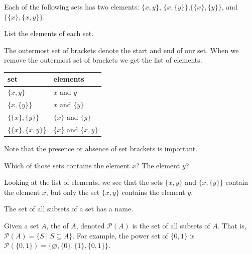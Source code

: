 \begin{exam}
\label{exam_2elt_sets}
    Each of the following sets has two elements: 
        $\{x, y\}$, $\{x,\{y\}\}$,$\{\{x\},\{y\}\}$, 
        and $\{\{x\}, \{x,y\} \}.$
        \begin{apart}
            \item List the elements of each set.
                \begin{soln}
                    The outermost set of brackets denote the start and end of our set.  When we remove the outermost set of brackets we get the list of elements.
                        \begin{center}
                            \begin{tabular}{l|l}
                                set & elements \\ \hline
                                $\{x, y\}$ &  $x$ and $y$\\
                                $\{x,\{y\}\}$ & $x$ and $\{y\}$ \\
                                $\{\{x\},\{y\}\}$ & $\{x\}$ and $\{y\}$ \\
                                $\{\{x\}, \{x,y\} \}$ & $\{x\}$ and $\{x,y\}$ 
                            \end{tabular}
                        \end{center}
                    Note that the presence or absence of set brackets is important. 
                \end{soln}
            \item Which of those sets contains the element $x$?  The element $y$?
                \begin{soln}
                    Looking at the list of elements, we see that the sets $\{x, y\}$ and $\{x,\{y\}\}$ contain the element $x$, but only the set $\{x, y\}$ contains the element $y$.
                \end{soln}
        \end{apart}
\end{exam}

The set of all subsets of a set has a name.

\begin{defn}
\label{defn_power_set}
    Given a set $A$, the  of $A$, denoted $\mathscr{P}(A)$ is the set of all subsets of $A$.  That is, $\mathscr{P}(A) = \{ S \mid S \subseteq A\}$.  For example, the power set of $\{0,1\}$ is $\mathscr{P}(\{0,1\}) = \{ \varnothing, \{0\}, \{1\}, \{0,1\}\}$.
\end{defn}


